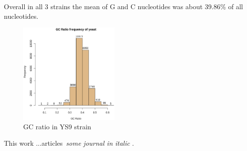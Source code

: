 \documentclass{article}
\begin{document}
Overall in all 3 strains the mean of G and C nucleotides was about 39.86\% of all nucleotides.
\begin{figure}[H]
\vspace{20pt}%
\includegraphics[width=50mm,scale=0.35]{images/AllGenomes.eps}
\caption{GC ratio in YS9 strain}
\label{fig:method}
\end{figure}
This work ...articles~\emph{some journal in italic} \cite{}.



\end{document}
